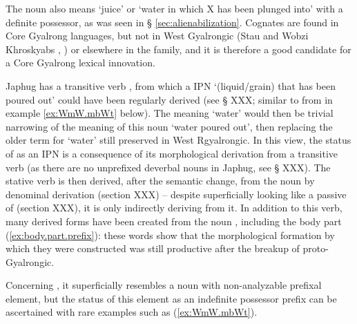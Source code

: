 The noun  also means `juice' or `water in which X has been plunged into' with a definite possessor, as was seen in § \ref{sec:alienabilization}. Cognates are found in Core Gyalrong languages, but not in West Gyalrongic (Stau  and Wobzi Khroskyabs , \citealt[610]{jacques17stau}) or elsewhere in the family, and it is therefore a good candidate for a Core Gyalrong lexical innovation. 

Japhug has a transitive verb , from which a IPN  `(liquid/grain) that has been poured out' could have been regularly derived (see § XXX; similar to  from  in example \ref{ex:WmW.mbWt} below). The meaning `water' would then be trivial narrowing of the meaning of this noun `water poured out', then replacing the older term for `water' still preserved in West Rgyalrongic. In this view, the status of   as an IPN is a consequence of its morphological derivation from a transitive verb (as there are no unprefixed deverbal nouns in Japhug, see § XXX). The stative verb  is then derived, after the semantic change, from the noun   by denominal derivation (section XXX) -- despite superficially looking like a passive of  (section XXX), it is only indirectly deriving from it. In addition to this verb, many derived forms have been created from the noun  , including the body part  (\ref{ex:body.part.prefix}): these words show that the morphological formation by which they were constructed was still productive after the breakup of proto-Gyalrongic.


Concerning , it superficially resembles a noun with non-analyzable  prefixal element, but the status of this element as an indefinite possessor prefix can be ascertained with rare examples such as (\ref{ex:WmW.mbWt}).

